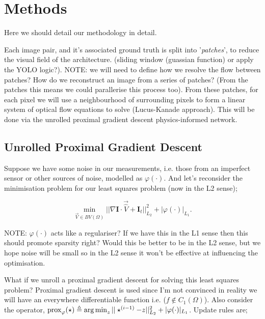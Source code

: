 \section{Methods} \label{sec:method}
\color{red}
Here we should detail our methodology in detail.
\color{gray}

\IEEEPARstart{}{} Each image pair, and it's associated ground truth is split into '\textit{patches}', to reduce the visual field of the architecture. (sliding window (guassian function) or apply the YOLO logic?). \color{red} NOTE: we will need to define how we resolve the flow between patches? How do we reconstruct an image from a series of patches? (From the patches this means we could parallerise this process too). \color{gray} From these patches, for each pixel we will use a neighbourhood of surrounding pixels to form a linear system of optical flow equations to solve (Lucus-Kanade approach). This will be done via the unrolled proximal gradient descent physics-informed network.

\subsection*{Unrolled Proximal Gradient Descent}

Suppose we have some noise in our measurements, i.e. those from an imperfect sensor or other sources of noise, modelled as $\varphi(\cdot)$. And let's reconsider the minimisation problem for our least squares problem (now in the L2 sense);

\begin{equation*}
    \min_{\vec{V} \in BV(\Omega)} \Big|\Big| \nabla \mathbf{I} \cdot \vec{\hat{V}} + \mathbf{I}_t \Big|\Big|^{2}_{L_2} + |\varphi(\cdot)|_{L_1}.
\end{equation*}

\color{red} NOTE: $\varphi(\cdot)$ acts like a regulariser? If we have this in the L1 sense then this should promote sparsity right? Would this be better to be in the L2 sense, but we hope noise will be small so in the L2 sense it won't be effective at influencing the optimisation.\color{gray}

What if we unroll a proximal gradient descent for solving this least squares problem? Proximal gradient descent is used since I'm not convinced in reality we will have an everywhere differentiable function i.e. ($f \notin C_{1}(\Omega)$). Also consider the operator, $\operatorname*{\mathrm{prox}}_{\varphi}(\star) \triangleq \operatorname*{arg\,min}_{z} ||\star^{(i-1)} - z||^{2}_{L_2} + |\varphi(\cdot)|_{L_1}$. Update rules are;

